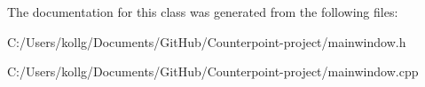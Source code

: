 The documentation for this class was generated from the following files\+:\begin{DoxyCompactItemize}
\item 
C\+:/\+Users/kollg/\+Documents/\+Git\+Hub/\+Counterpoint-\/project/mainwindow.\+h\item 
C\+:/\+Users/kollg/\+Documents/\+Git\+Hub/\+Counterpoint-\/project/mainwindow.\+cpp\end{DoxyCompactItemize}
